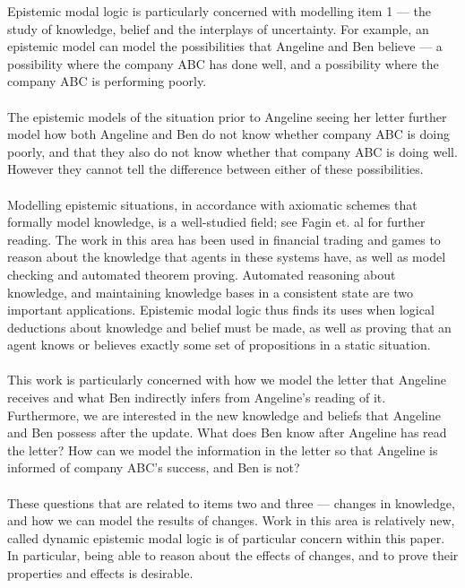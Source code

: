 Epistemic modal logic is particularly concerned with modelling item 1 --- the study of knowledge,
belief and the interplays of uncertainty.
For example, an epistemic model can model the possibilities that Angeline and Ben believe --- a
possibility where the company ABC has done well, and a possibility where the company ABC is
performing poorly.\\
\\
The epistemic models of the situation prior to Angeline seeing her letter further model how both Angeline
and Ben do not know whether company ABC is doing poorly, and that they also do not know whether
that company ABC is doing well.
However they cannot tell the difference between either of these possibilities.\\
\\
Modelling epistemic situations, in accordance with axiomatic schemes that
formally model knowledge, is a well-studied field; see Fagin et. al \cite{fagin1995reasoning} for
further reading.
The work in this area has been used in financial trading and games to reason about the knowledge
that agents in these systems have, as well as model checking and automated theorem proving.
Automated reasoning about knowledge, and maintaining knowledge bases in a consistent state are two important
applications.
Epistemic modal logic thus finds its uses when logical deductions about knowledge and belief must be
made, as well as proving that an agent knows or believes exactly some set of propositions in a
static situation.\\
\\
This work is particularly concerned with how we model the letter that Angeline receives and what Ben
indirectly infers from Angeline's reading of it.
Furthermore, we are interested in the new knowledge and beliefs that Angeline and Ben possess after the update.
What does Ben know after Angeline has read the letter?
How can we model the information in the letter so that Angeline is informed of company ABC's success,
and Ben is not?\\
\\
These questions that are related to items two and three --- changes in knowledge, and how we can
model the results of changes.
Work in this area is relatively new, called dynamic epistemic modal logic is of particular concern
within this paper.
In particular, being able to reason about the effects of changes, and to prove their properties and
effects is desirable.\\
\\
